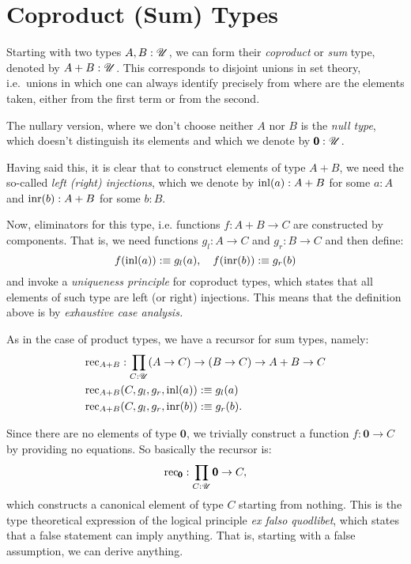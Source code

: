 \section{Coproduct (Sum) Types}

Starting with two types $ A, B : \mathscr{U} $, we can form their \emph{coproduct}
or \emph{sum} type, denoted by $ A + B : \mathscr{U} $. This corresponds to disjoint
unions in set theory, i.e.\ unions in which one can always identify precisely
from where are the elements taken, either from the first term or from the second.

The nullary version, where we don't choose neither $ A $ nor $ B $ is the
\emph{null type}, which doesn't distinguish its elements and which we denote
by $ \pmb{0} : \mathscr{U} $.

Having said this, it is clear that to construct elements of type $ A + B $,
we need the so-called \emph{left (right) injections}, which we denote by
$ \mathrm{inl}(a) : A + B $ for some $ a : A $ and $ \mathrm{inr}(b) : A + B $
for some $ b : B $.

Now, eliminators for this type, i.e. functions $ f : A + B \to C $ are
constructed by components. That is, we need functions $ g_l : A \to C $
and $ g_r : B \to C $ and then define:
\[
  f(\mathrm{inl}(a)) :\equiv g_l(a), \quad
  f(\mathrm{inr}(b)) :\equiv g_r(b)
\]
and invoke a \emph{uniqueness principle} for coproduct types, which states
that all elements of such type are left (or right) injections. This means
that the definition above is by \emph{exhaustive case analysis.}

As in the case of product types, we have a recursor for sum types,
namely:
\begin{align*}
  &\mathrm{rec}_{A + B} : \prod_{C : \mathscr{U}} (A \to C) \to (B \to C) \to A + B \to C \\
  &\mathrm{rec}_{A + B} (C, g_l, g_r, \mathrm{inl}(a)) :\equiv g_l(a) \\
  &\mathrm{rec}_{A + B} (C, g_l, g_r, \mathrm{inr}(b)) :\equiv g_r(b).
\end{align*}

Since there are no elements of type $ \pmb{0} $, we trivially construct
a function $ f : \pmb{0} \to C $ by providing no equations. So basically
the recursor is:
\[
  \mathrm{rec}_{\pmb{0}} : \prod_{C : \mathscr{U}} \pmb{0} \to C,
\]
which constructs a canonical element of type $ C $ starting from nothing.
This is the type theoretical expression of the logical principle
\emph{ex falso quodlibet}, which states that a false statement can imply
anything. That is, starting with a false assumption, we can derive anything.

